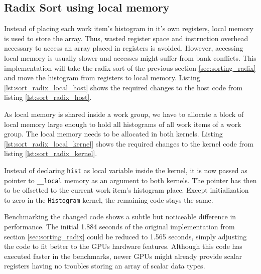 \subsection{Radix Sort using local memory}
\label{sec:sorting_radix_local}

Instead of placing each work item's histogram in it's own registers, local memory is used to store the array. Thus, wasted register space and instruction overhead necessary to access an array placed in registers is avoided. However, accessing local memory is usually slower and accesses might suffer from bank conflicts. This implementation will take the radix sort of the previous section \ref{sec:sorting_radix} and move the histogram from registers to local memory.
Listing \ref{lst:sort_radix_local_host} shows the required changes to the host code from listing \ref{lst:sort_radix_host}.



As local memory is shared inside a work group, we have to allocate a block of local memory large enough to hold all histograms of all work items of a work group. The local memory needs to be allocated in both kernels.
Listing \ref{lst:sort_radix_local_kernel} shows the required changes to the kernel code from listing \ref{lst:sort_radix_kernel}.



Instead of declaring \lstinline!hist! as local variable inside the kernel, it is now passed as pointer to \lstinline!__local! memory as an argument to both kernels. The pointer has then to be offsetted to the current work item's histogram place. Except initialization to zero in the \lstinline!Histogram! kernel, the remaining code stays the same.

Benchmarking the changed code shows a subtle but noticeable difference in performance. The initial 1.884 seconds of the original implementation from section \ref{sec:sorting_radix} could be reduced to 1.565 seconds, simply adjusting the code to fit better to the GPUs hardware features. Although this code has executed faster in the benchmarks, newer GPUs might already provide scalar registers having no troubles storing an array of scalar data types.

